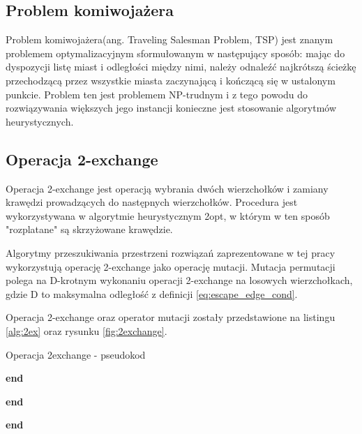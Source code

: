 \subsection{Problem komiwojażera}
Problem komiwojażera(ang. Traveling Salesman Problem, TSP) jest znanym problemem optymalizacyjnym
sformułowanym w następujący sposób: mając do dyspozycji listę miast i odległości między nimi, należy odnaleźć
najkrótszą ścieżkę przechodzącą przez wszystkie miasta zaczynającą i kończącą się w ustalonym punkcie.
Problem ten jest problemem NP-trudnym i z tego powodu do rozwiązywania większych jego instancji konieczne
jest stosowanie algorytmów heurystycznych.
\subsection{Operacja 2-exchange}
Operacja 2-exchange jest operacją wybrania dwóch wierzchołków i zamiany krawędzi prowadzących do następnych wierzchołków.
Procedura jest wykorzystywana w algorytmie heurystycznym 2opt, w którym w ten sposób "rozplatane" są skrzyżowane krawędzie.

Algorytmy przeszukiwania przestrzeni rozwiązań zaprezentowane w tej pracy wykorzystują operację 2-exchange jako operację mutacji.
Mutacja permutacji polega na D-krotnym wykonaniu operacji 2-exchange na losowych wierzchołkach, gdzie D to maksymalna odległość
z definicji \ref{eq:escape_edge_cond}.

Operacja 2-exchange oraz operator mutacji zostały przedstawione na listingu \ref{alg:2ex} oraz rysunku \ref{fig:2exchange}.

\begin{algorithm}[h!]
      \caption{Operacja 2exchange - pseudokod}\label{alg:2ex}


      \textbf{end}

      \vspace{0.5em}


      \textbf{end}

      \vspace{0.5em}

      \textbf{end}

\end{algorithm}

